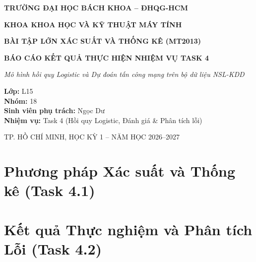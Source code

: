 \documentclass[12pt,a4paper,oneside]{report}
\begin{document}
\begin{titlepage}
\centering
\vspace*{1.5cm}
{\Large\bfseries TRƯỜNG ĐẠI HỌC BÁCH KHOA -- ĐHQG-HCM\par}
{\large\bfseries KHOA KHOA HỌC VÀ KỸ THUẬT MÁY TÍNH\par}
\vspace{2cm}
{\LARGE\bfseries BÀI TẬP LỚN XÁC SUẤT VÀ THỐNG KÊ (MT2013)\par}
\vspace{1cm}
{\Large\bfseries BÁO CÁO KẾT QUẢ THỰC HIỆN NHIỆM VỤ TASK 4\par}
\vspace{0.5cm}
{\large\itshape Mô hình hồi quy Logistic và Dự đoán tấn công mạng trên bộ dữ liệu NSL-KDD\par}
\vspace{2.5cm}

\begin{flushleft}
\large
\hspace{3cm}\textbf{Lớp:} L15\\
\hspace{3cm}\textbf{Nhóm:} 18\\
\hspace{3cm}\textbf{Sinh viên phụ trách:} Ngọc Dư\\
\hspace{3cm}\textbf{Nhiệm vụ:} Task 4 (Hồi quy Logistic, Đánh giá \& Phân tích lỗi)
\end{flushleft}

\vfill
{\large TP. HỒ CHÍ MINH, HỌC KỲ 1 -- NĂM HỌC 2026--2027\par}
\vspace*{1cm}
\end{titlepage}

\tableofcontents
\clearpage
\listoffigures
\clearpage
\listoftables
\clearpage
{}

\chapter{Phương pháp Xác suất và Thống kê (Task 4.1)}


\chapter{Kết quả Thực nghiệm và Phân tích Lỗi (Task 4.2)}



\end{document}
